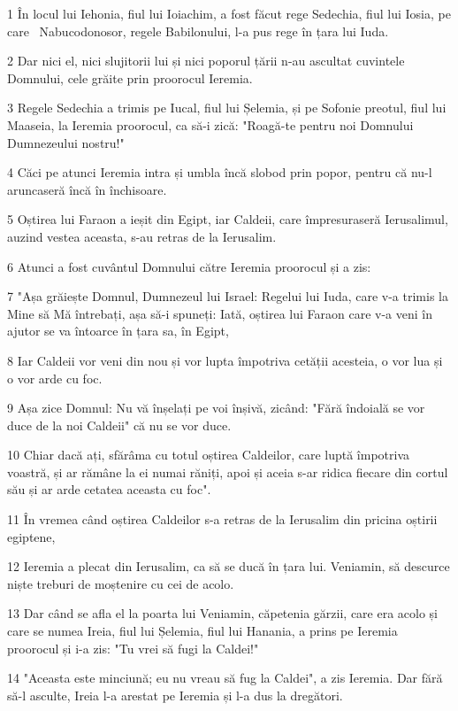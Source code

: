 \par 1 În locul lui Iehonia, fiul lui Ioiachim, a fost făcut rege Sedechia, fiul lui Iosia, pe care  Nabucodonosor, regele Babilonului, l-a pus rege în țara lui Iuda.
\par 2 Dar nici el, nici slujitorii lui și nici poporul țării n-au ascultat cuvintele Domnului, cele grăite prin proorocul Ieremia.
\par 3 Regele Sedechia a trimis pe Iucal, fiul lui Șelemia, și pe Sofonie preotul, fiul lui Maaseia, la Ieremia proorocul, ca să-i zică: "Roagă-te pentru noi Domnului Dumnezeului nostru!"
\par 4 Căci pe atunci Ieremia intra și umbla încă slobod prin popor, pentru că nu-l aruncaseră încă în închisoare.
\par 5 Oștirea lui Faraon a ieșit din Egipt, iar Caldeii, care împresuraseră Ierusalimul, auzind vestea aceasta, s-au retras de la Ierusalim.
\par 6 Atunci a fost cuvântul Domnului către Ieremia proorocul și a zis:
\par 7 "Așa grăiește Domnul, Dumnezeul lui Israel: Regelui lui Iuda, care v-a trimis la Mine să Mă întrebați, așa să-i spuneți: Iată, oștirea lui Faraon care v-a veni în ajutor se va întoarce în țara sa, în Egipt,
\par 8 Iar Caldeii vor veni din nou și vor lupta împotriva cetății acesteia, o vor lua și o vor arde cu foc.
\par 9 Așa zice Domnul: Nu vă înșelați pe voi înșivă, zicând: "Fără îndoială se vor duce de la noi Caldeii" că nu se vor duce.
\par 10 Chiar dacă ați, sfărâma cu totul oștirea Caldeilor, care luptă împotriva voastră, și ar rămâne la ei numai răniți, apoi și aceia s-ar ridica fiecare din cortul său și ar arde cetatea aceasta cu foc".
\par 11 În vremea când oștirea Caldeilor s-a retras de la Ierusalim din pricina oștirii egiptene,
\par 12 Ieremia a plecat din Ierusalim, ca să se ducă în țara lui. Veniamin, să descurce niște treburi de moștenire cu cei de acolo.
\par 13 Dar când se afla el la poarta lui Veniamin, căpetenia gărzii, care era acolo și care se numea Ireia, fiul lui Șelemia, fiul lui Hanania, a prins pe Ieremia proorocul și i-a zis: "Tu vrei să fugi la Caldei!"
\par 14 "Aceasta este minciună; eu nu vreau să fug la Caldei", a zis Ieremia. Dar fără să-l asculte, Ireia l-a arestat pe Ieremia și l-a dus la dregători.
